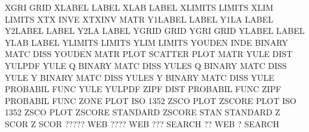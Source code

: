 XGRI                                    GRID
XLABEL                                  LABEL
XLAB                                    LABEL
XLIMITS                                 LIMITS
XLIM                                    LIMITS
XTX      INVE                           XTXINV   MATR
Y1LABEL                                 LABEL
Y1LA                                    LABEL
Y2LABEL                                 LABEL
Y2LA                                    LABEL
YGRID                                   GRID
YGRI                                    GRID
YLABEL                                  LABEL
YLAB                                    LABEL
YLIMITS                                 LIMITS
YLIM                                    LIMITS
YOUDEN   INDE                           BINARY   MATC DISS
YOUDEN   MATR PLOT                      SCATTER  PLOT MATR
YULE     DIST                           YULPDF
YULE     Q                              BINARY   MATC DISS
YULES    Q                              BINARY   MATC DISS
YULE     Y                              BINARY   MATC DISS
YULES    Y                              BINARY   MATC DISS
YULE                                    PROBABIL FUNC
YULE                                    YULPDF
ZIPF     DIST                           PROBABIL FUNC
ZIPF                                    PROBABIL FUNC
ZONE     PLOT                           ISO      1352 ZSCO PLOT
ZSCORE   PLOT                           ISO      1352 ZSCO PLOT
ZSCORE                                  STANDARD
ZSCORE   STAN                           STANDARD
Z        SCOR                           Z        SCOR
?????                                   WEB
????                                    WEB
???                                     SEARCH
??                                      WEB
?                                       SEARCH

